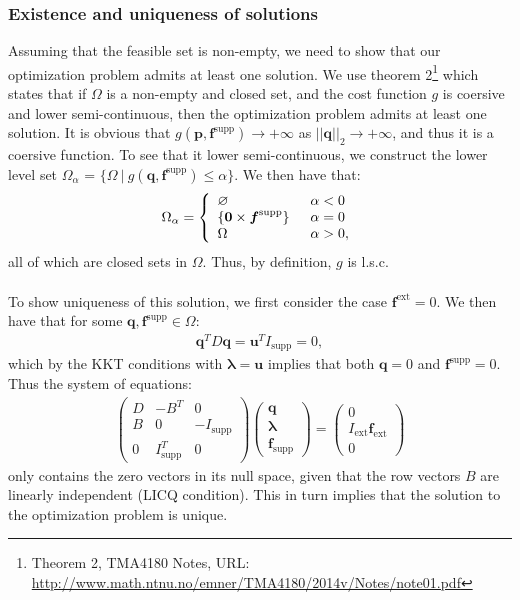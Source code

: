 \documentclass[10pt,a4paper]{article}
\begin{document}
\subsubsection{Existence and uniqueness of solutions}
Assuming that the feasible set is non-empty, we need to show that our optimization problem admits at least one solution. We use theorem 2\footnote{Theorem 2, TMA4180 Notes, URL: \url{http://www.math.ntnu.no/emner/TMA4180/2014v/Notes/note01.pdf}} which states that if $\Omega$ is a non-empty and closed set, and the cost function $g$ is coersive and lower semi-continuous, then the optimization problem admits at least one solution. It is obvious that $g(\boldsymbol{p},\boldsymbol{f}^\text{supp}) \rightarrow +\infty$ as $||\boldsymbol{q}||_2 \rightarrow +\infty$, and thus it is a coersive function. To see that it lower semi-continuous, we construct the lower level set $\Omega_\alpha$ = $\{\Omega \ | \ g(\boldsymbol{q},\boldsymbol{f}^\text{supp}) \leq \alpha \}$. We then have that:
\begin{align}
\Omega_\alpha = \left\lbrace 
\begin{array}{l l l}
\varnothing & \enspace \alpha < 0\\
\{\boldsymbol{0} \times \boldsymbol{f}^\text{supp}\} & \enspace \alpha = 0\\
\Omega & \enspace \alpha > 0,
\end{array}\right.
\end{align}
all of which are closed sets in $\Omega$. Thus, by definition, $g$ is l.s.c.
\\\\
To show uniqueness of this solution, we first consider the case $\boldsymbol{f}^{\text{ext}} = 0$. We then have that for some $\boldsymbol{q},\boldsymbol{f}^{\text{supp}}\in\Omega$:
\begin{align*}
\boldsymbol{q}^T D \boldsymbol{q} = \boldsymbol{u}^T I_{\text{supp}} = 0,
\end{align*}
which by the KKT conditions with $\boldsymbol{\lambda} = \boldsymbol{u}$ implies that both $\boldsymbol{q} = 0$ and $\boldsymbol{f}^{\text{supp}}=0$. Thus the system of equations:
\begin{align}
\begin{pmatrix}
D & -B^T & 0\\
B & 0 & -I_\text{supp}\\
0 & I_\text{supp}^T & 0 
\end{pmatrix}
\begin{pmatrix}
\boldsymbol{q}\\
\boldsymbol{\lambda}\\
\boldsymbol{f}_\text{supp}
\end{pmatrix}
=
\begin{pmatrix}
0\\
I_\text{ext}\boldsymbol{f}_\text{ext}\\
0
\end{pmatrix}
\end{align}
only contains the zero vectors in its null space, given that the row vectors $B$ are linearly independent (LICQ condition). This in turn implies that the solution to the optimization problem is unique.
\end{document}
